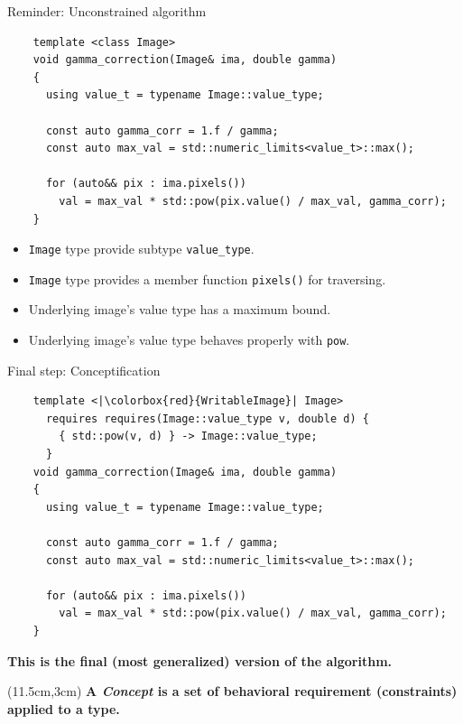 \documentclass[12pt,aspectratio=169]{beamer}
\begin{document}
\begin{frame}[fragile]{Reminder: Unconstrained algorithm}
  \begin{verbatim}
    template <class Image>
    void gamma_correction(Image& ima, double gamma)
    {
      using value_t = typename Image::value_type;

      const auto gamma_corr = 1.f / gamma;
      const auto max_val = std::numeric_limits<value_t>::max();
    
      for (auto&& pix : ima.pixels())
        val = max_val * std::pow(pix.value() / max_val, gamma_corr);
    }
  \end{verbatim}
  \begin{itemize}
    \item \texttt{Image} type provide subtype \texttt{value\_type}.
    \item \texttt{Image} type provides a member function \texttt{pixels()} for traversing.
    \item Underlying image's value type has a maximum bound.
    \item Underlying image's value type behaves properly with \texttt{pow}.
  \end{itemize}
\end{frame}

\begin{frame}[fragile]{Final step: Conceptification}
  \begin{verbatim}
    template <|\colorbox{red}{WritableImage}| Image>
      requires requires(Image::value_type v, double d) {
        { std::pow(v, d) } -> Image::value_type;
      }
    void gamma_correction(Image& ima, double gamma)
    {
      using value_t = typename Image::value_type;
    
      const auto gamma_corr = 1.f / gamma;
      const auto max_val = std::numeric_limits<value_t>::max();
    
      for (auto&& pix : ima.pixels())
        val = max_val * std::pow(pix.value() / max_val, gamma_corr);
    }
  \end{verbatim}
  \vfill
  \begin{center}\textbf{This is the final (most generalized) version of the algorithm.}\end{center}
  \begin{textblock*}{4cm}(11.5cm,3cm)
    \textbf{A \emph{Concept} is a set of behavioral requirement (constraints) applied to a type.}
  \end{textblock*}
\end{frame}
\end{document}
